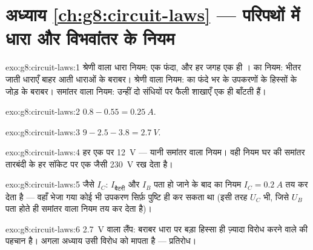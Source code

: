 \section*{अध्याय \ref{ch:g8:circuit-laws} --- परिपथों में धारा और विभवांतर के नियम}

\begin{solution}{exo:g8:circuit-laws:1}
श्रेणी वाला धारा नियम: एक फंदा, और हर जगह एक ही ।  का
नियम: भीतर जाती धाराएँ बाहर आती धाराओं के बराबर। श्रेणी वाला
 नियम:  का  फंदे भर के उपकरणों के हिस्सों के जोड़
के बराबर। समांतर वाला  नियम: उन्हीं दो संधियों पर फैली शाखाएँ
एक ही  बाँटती हैं।
\end{solution}

\begin{solution}{exo:g8:circuit-laws:2}
$0.8 - 0.55 = \qty{0.25}{A}$.
\end{solution}

\begin{solution}{exo:g8:circuit-laws:3}
$9 - 2.5 - 3.8 = \qty{2.7}{V}$.
\end{solution}

\begin{solution}{exo:g8:circuit-laws:4}
हर एक पर \qty{12}{V} --- यानी समांतर वाला  नियम। वही नियम घर
की समांतर तारबंदी के हर सॉकेट पर एक जैसी \qty{230}{V} रख देता है।
\end{solution}

\begin{solution}{exo:g8:circuit-laws:5}
जैसे $I_C$: $I_{\text{बैटरी}}$ और $I_B$ पता हो जाने के बाद  का
नियम $I_C = \qty{0.2}{A}$ तय कर देता है --- वहाँ भेजा गया कोई भी
उपकरण सिर्फ़ पुष्टि ही कर सकता था (इसी तरह $U_C$ भी, जिसे $U_B$ पता
होते ही समांतर वाला  नियम तय कर देता है)।
\end{solution}

\begin{solution}{exo:g8:circuit-laws:6}
\qty{2.7}{V} वाला लैंप: बराबर धारा पर बड़ा  हिस्सा ही ज़्यादा
विरोध करने वाले की पहचान है। अगला अध्याय उसी विरोध को मापता है ---
प्रतिरोध।
\end{solution}

